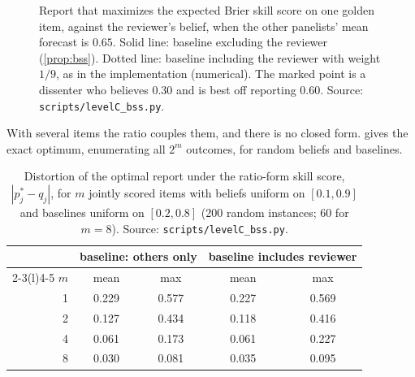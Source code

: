 \begin{figure}[t]
\centering
{}
\caption{Report that maximizes the expected Brier skill score on one golden item, against the
reviewer's belief, when the other panelists' mean forecast is $0.65$. Solid line: baseline
excluding the reviewer (\cref{prop:bss}). Dotted line: baseline including the reviewer with
weight $1/9$, as in the implementation (numerical). The marked point is a dissenter who
believes $0.30$ and is best off reporting $0.60$. Source: \texttt{scripts/levelC\_bss.py}.}
\label{fig:bss}
\end{figure}

With several items the ratio couples them, and there is no closed form.  gives the
exact optimum, enumerating all $2^m$ outcomes, for random beliefs and baselines.

\begin{table}[t]
\centering\small
\caption{Distortion of the optimal report under the ratio-form skill score, $|p^*_j-q_j|$,
for $m$ jointly scored items with beliefs uniform on $[0.1,0.9]$ and baselines uniform on
$[0.2,0.8]$ (200 random instances; 60 for $m=8$). Source: \texttt{scripts/levelC\_bss.py}.}
\label{tab:bss}
\begin{tabular}{@{}rcccc@{}}
\toprule
& \multicolumn{2}{c}{baseline: others only} & \multicolumn{2}{c}{baseline includes reviewer}\\
\cmidrule(lr){2-3}\cmidrule(l){4-5}
$m$ & mean & max & mean & max\\
\midrule
1 & 0.229 & 0.577 & 0.227 & 0.569\\
2 & 0.127 & 0.434 & 0.118 & 0.416\\
4 & 0.061 & 0.173 & 0.061 & 0.227\\
8 & 0.030 & 0.081 & 0.035 & 0.095\\
\bottomrule
\end{tabular}
\end{table}

